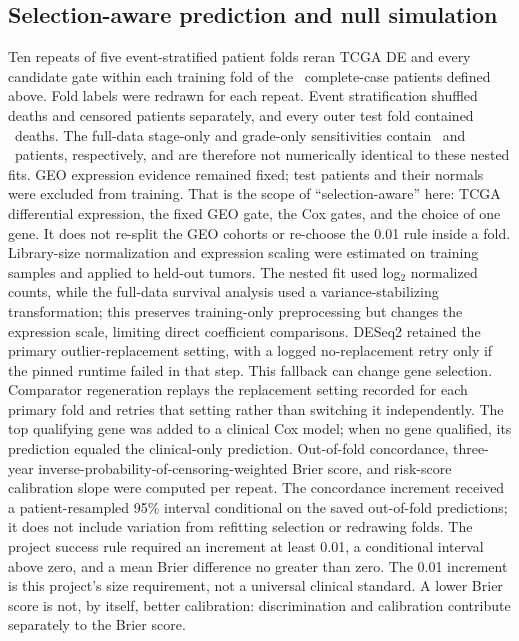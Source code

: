 \subsection{Selection-aware prediction and null simulation}
Ten repeats of five event-stratified patient folds reran TCGA DE and every candidate gate within each training fold of the \NestedPatients\ complete-case patients defined above. Fold labels were redrawn for each repeat. Event stratification shuffled deaths and censored patients separately, and every outer test fold contained \FoldTestEvents\ deaths. The full-data stage-only and grade-only sensitivities contain \StageOnlyPatients\ and \GradeOnlyPatients\ patients, respectively, and are therefore not numerically identical to these nested fits. GEO expression evidence remained fixed; test patients and their normals were excluded from training. That is the scope of ``selection-aware'' here: TCGA differential expression, the fixed GEO gate, the Cox gates, and the choice of one gene. It does not re-split the GEO cohorts or re-choose the 0.01 rule inside a fold. Library-size normalization and expression scaling were estimated on training samples and applied to held-out tumors. The nested fit used log$_2$ normalized counts, while the full-data survival analysis used a variance-stabilizing transformation; this preserves training-only preprocessing but changes the expression scale, limiting direct coefficient comparisons. DESeq2 retained the primary outlier-replacement setting, with a logged no-replacement retry only if the pinned runtime failed in that step. This fallback can change gene selection. Comparator regeneration replays the replacement setting recorded for each primary fold and retries that setting rather than switching it independently. The top qualifying gene was added to a clinical Cox model; when no gene qualified, its prediction equaled the clinical-only prediction. Out-of-fold concordance, three-year inverse-probability-of-censoring-weighted Brier score, and risk-score calibration slope were computed per repeat. The concordance increment received a patient-resampled 95\% interval conditional on the saved out-of-fold predictions; it does not include variation from refitting selection or redrawing folds. The project success rule required an increment at least 0.01, a conditional interval above zero, and a mean Brier difference no greater than zero. The 0.01 increment is this project's size requirement, not a universal clinical standard. A lower Brier score is not, by itself, better calibration: discrimination and calibration contribute separately to the Brier score.

